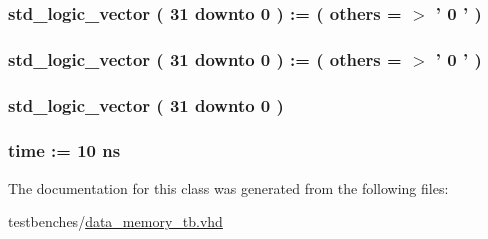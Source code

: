 \hypertarget{classdata__memory__tb_1_1behavior_ad00e55d610ace0812e82bd88e7bfc072}{
\subsubsection[{adress}]{ {\bfseries std\-\_\-logic\-\_\-vector (   31    downto    0  )  \-:= (  others  = $>$ '  0  '  ) } }}\label{classdata__memory__tb_1_1behavior_ad00e55d610ace0812e82bd88e7bfc072}
\hypertarget{classdata__memory__tb_1_1behavior_a132a1487bc7afa2de397e2c6f1b4f576}{
\subsubsection[{write\-\_\-data}]{ {\bfseries std\-\_\-logic\-\_\-vector (   31    downto    0  )  \-:= (  others  = $>$ '  0  '  ) } }}\label{classdata__memory__tb_1_1behavior_a132a1487bc7afa2de397e2c6f1b4f576}
\hypertarget{classdata__memory__tb_1_1behavior_a0ffc759f5a888e5c7c7b770e1d0829a8}{
\subsubsection[{read\-\_\-data}]{ {\bfseries std\-\_\-logic\-\_\-vector (   31    downto    0  ) } }}\label{classdata__memory__tb_1_1behavior_a0ffc759f5a888e5c7c7b770e1d0829a8}
\hypertarget{classdata__memory__tb_1_1behavior_a25815afa4d614fdd5f49e43c04e1a946}{
\subsubsection[{clk\-\_\-period}]{ {\bfseries time  \-:=  10  ns } }}\label{classdata__memory__tb_1_1behavior_a25815afa4d614fdd5f49e43c04e1a946}


\-The documentation for this class was generated from the following files\-:\begin{DoxyCompactItemize}
\item 
testbenches/\hyperlink{data__memory__tb_8vhd}{data\-\_\-memory\-\_\-tb.\-vhd}\end{DoxyCompactItemize}
